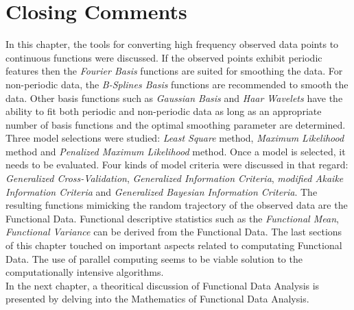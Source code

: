 \section{Closing Comments}
In this chapter, the tools for converting high frequency observed data points to continuous functions were discussed. If the observed points exhibit periodic features then the \textit{Fourier Basis} functions are suited for smoothing the data. For non-periodic data, the \textit{B-Splines Basis} functions are recommended to smooth the data. Other basis functions such as \textit{Gaussian Basis} and \textit{Haar Wavelets} have the ability to fit both periodic and non-periodic data as long as an appropriate number of basis functions and the optimal smoothing parameter are determined. Three model selections were studied: \textit{Least Square} method, \textit{Maximum Likelihood} method and \textit{Penalized Maximum Likelihood} method. Once a model is selected, it needs to be evaluated. Four kinds of model criteria were discussed in that regard: \textit{Generalized Cross-Validation}, \textit{Generalized Information Criteria}, \textit{modified Akaike Information Criteria} and \textit{Generalized Bayesian Information Criteria}. The resulting functions mimicking the random trajectory of the observed data are the Functional Data. Functional descriptive statistics such as the \textit{Functional Mean}, \textit{Functional Variance} can be derived from the Functional Data. The last sections of this chapter touched on important aspects related to computating Functional Data. The use of parallel computing seems to be viable solution to the computationally intensive algorithms. \\
In the next chapter, a theoritical discussion of Functional Data Analysis is presented by delving into the Mathematics of Functional Data Analysis.